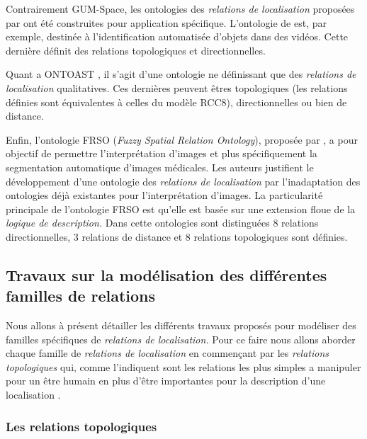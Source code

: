 Contrairement GUM-Space, les ontologies des \emph{relations de
  localisation} proposées par
\textcite{Dasiopoulou2005,Miron2007,Hudelot2008a} ont été construites
pour application spécifique. L'ontologie de \textcite{Dasiopoulou2005}
est, par exemple, destinée à l'identification automatisée d'objets
dans des vidéos. Cette dernière définit des relations topologiques et
directionnelles. 

Quant a ONTOAST \autocite{Miron2007}, il s'agit d'une ontologie ne
définissant que des \emph{relations de localisation} qualitatives. Ces
dernières peuvent êtres topologiques (les relations définies sont
équivalentes à celles du modèle RCC8), directionnelles ou bien de
distance.

Enfin, l'ontologie FRSO (\emph{Fuzzy Spatial Relation Ontology}),
proposée par \textcite{Hudelot2008a}, a pour objectif de permettre
l’interprétation d'images et plus spécifiquement la segmentation
automatique d'images médicales. Les auteurs justifient le
développement d'une ontologie des \emph{relations de localisation} par
l'inadaptation des ontologies déjà existantes pour l'interprétation
d'images.
%
La particularité principale de l'ontologie FRSO est qu'elle est basée
sur une extension floue de la \emph{logique de description.}
%
Dans cette ontologies sont distinguées 8 relations directionnelles, 3
relations de distance et 8 relations topologiques sont définies.

\subsection{Travaux sur la modélisation des différentes familles de
  relations}

Nous allons à présent détailler les différents travaux proposés pour
modéliser des familles spécifiques de \emph{relations de
  localisation.} Pour ce faire nous allons aborder chaque famille de
\emph{relations de localisation} en commençant par les \emph{relations
  topologiques} qui, comme l'indiquent \textcite{Aurnague1997} sont
les relations les plus simples a manipuler pour un être humain en plus
d'être importantes pour la description d'une localisation
\autocite{Egenhofer1995}.

\subsubsection{Les relations topologiques}



